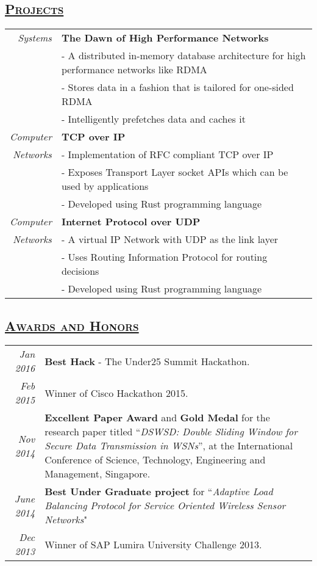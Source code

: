 \documentclass[14pt]{article}
\begin{document}
\subsection* {\scshape\Large\uline {Projects}}
\begin{tabularx}{\textwidth}{r X}
\emph{Systems}  & \textbf{The Dawn of High Performance Networks} \\
	        & - A distributed in-memory database architecture for high performance networks like RDMA \\
		& - Stores data in a fashion that is tailored for one-sided RDMA \\
		& - Intelligently prefetches data and caches it \\
\emph{Computer} & \textbf{TCP over IP} \\
\emph{Networks} &  - Implementation of RFC compliant TCP over IP\\
                             & - Exposes Transport Layer socket APIs which can be used by applications\\
                             & - Developed using Rust programming language \\
\emph{Computer} & \textbf{Internet Protocol over UDP} \\
\emph{Networks} & - A virtual IP Network with UDP as the link layer\\
                             & - Uses Routing Information Protocol for routing decisions\\
                             & - Developed using Rust programming language\\
\end{tabularx}


\subsection* {\scshape\LARGE\uline {Awards and Honors}}
\begin{tabularx}{\textwidth}{r X}
\emph{Jan 2016} &  \textbf{Best Hack} - The Under25 Summit Hackathon.\\
\emph{Feb 2015} & Winner of Cisco Hackathon 2015.\\
\emph{Nov 2014} & \textbf{Excellent Paper Award} and \textbf{Gold Medal} for the research paper  titled ``\emph{DSWSD: Double Sliding Window for Secure Data Transmission in WSNs}'', at the International Conference of Science, Technology, Engineering and Management, Singapore. \\ 
\emph{June 2014} & \textbf{Best Under Graduate project} for ``\emph{Adaptive Load Balancing Protocol for Service Oriented Wireless Sensor Networks}" \\ 
\emph{Dec 2013} & Winner of SAP Lumira University Challenge 2013. \\ 
\end{tabularx}
\end{document}
